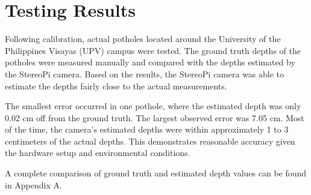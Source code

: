 \section{Testing Results}

Following calibration, actual potholes located around the University of the Philippines Visayas (UPV) campus were tested. The ground truth depths of the potholes were measured manually and compared with the depths estimated by the StereoPi camera. Based on the results, the StereoPi camera was able to estimate the depths fairly close to the actual measurements. 

The smallest error occurred in one pothole, where the estimated depth was only 0.02 cm off from the ground truth. The largest observed error was 7.05 cm. Most of the time, the camera’s estimated depths were within approximately 1 to 3 centimeters of the actual depths. This demonstrates reasonable accuracy given the hardware setup and environmental conditions. 

A complete comparison of ground truth and estimated depth values can be found in Appendix A.



